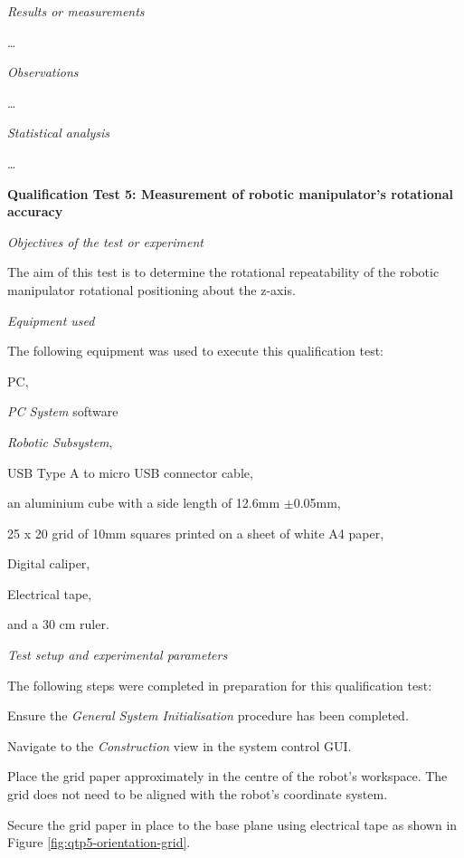 \textit{Results or measurements}

\ldots

\textit{Observations}

\ldots

\textit{Statistical analysis}

\ldots

\textbf{Qualification Test 5: Measurement of robotic manipulator's rotational accuracy}

\textit{Objectives of the test or experiment}

The aim of this test is to determine the rotational repeatability of the robotic manipulator rotational positioning about the z-axis.

\textit{Equipment used}

The following equipment was used to execute this qualification test:

\begin{compactitem}
	\item PC,
	\item \textit{PC System} software
	\item \textit{Robotic Subsystem},
	\item USB Type A to micro USB connector cable,
	\item an aluminium cube with a side length of 12.6mm $\pm$0.05mm,
	\item 25 x 20 grid of 10mm squares printed on a sheet of white A4 paper,
	\item Digital caliper,
	\item Electrical tape,
	\item and a 30 cm ruler.
\end{compactitem}

\textit{Test setup and experimental parameters}

The following steps were completed in preparation for this qualification test:

\begin{compactenum}
	\item Ensure the \textit{General System Initialisation} procedure has been completed.
	\item Navigate to the \textit{Construction} view in the system control GUI.
	\item Place the grid paper approximately in the centre of the robot's workspace. The grid does not need to be aligned with the robot's coordinate system.
	\item Secure the grid paper in place to the base plane using electrical tape as shown in Figure \ref{fig:qtp5-orientation-grid}.
\end{compactenum}

